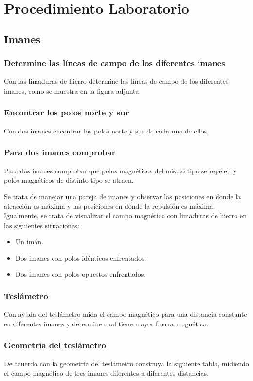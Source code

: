 \section{Procedimiento Laboratorio}
\subsection{Imanes}

\subsubsection{Determine las líneas de campo de los diferentes imanes}
Con las limaduras de hierro determine las líneas de campo de los diferentes
imanes, como se muestra en la figura adjunta.


\subsubsection{Encontrar los polos norte y sur}
Con dos imanes encontrar los polos norte y sur de cada uno de ellos.


\subsubsection{Para dos imanes comprobar}
Para dos imanes comprobar que polos magnéticos del mismo tipo se repelen y polos
magnéticos de distinto tipo se atraen.

Se trata de manejar una pareja de imanes y observar las posiciones en donde la
atracción es máxima y las posiciones en donde la repulsión es máxima.
Igualmente, se trata de visualizar el campo magnético con limaduras de hierro en
las siguientes situaciones:

\begin{itemize}
    \item Un imán.
    \item Dos imanes con polos idénticos enfrentados.
    \item Dos imanes con polos opuestos enfrentados.
\end{itemize}


\subsubsection{Teslámetro}
Con ayuda del teslámetro mida el campo magnético para una distancia constante en
diferentes imanes y determine cual tiene mayor fuerza magnética.


\subsubsection{Geometría del teslámetro}
De acuerdo con la geometría del teslámetro construya la siguiente tabla,
midiendo el campo magnético de tres imanes diferentes a diferentes distancias.


